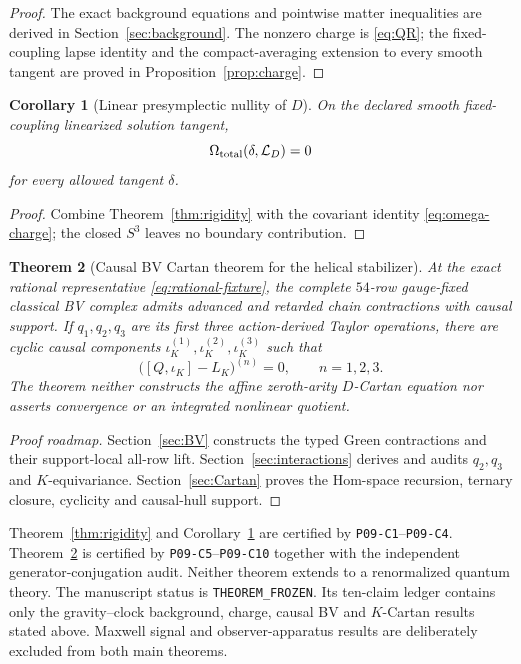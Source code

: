 \documentclass[11pt]{article}
\newtheorem{theorem}{Theorem}[section]
\newtheorem{corollary}[theorem]{Corollary}
\theoremstyle{definition}
\theoremstyle{remark}
\newcommand{\cL}{\mathcal L}
\newcommand{\claimid}[1]{\texttt{#1}}
\begin{document}
\begin{proof}
The exact background equations and pointwise matter inequalities are derived
in Section~\ref{sec:background}.  The nonzero charge is \eqref{eq:QR}; the
fixed-coupling lapse identity and the compact-averaging extension to every
smooth tangent are proved in Proposition~\ref{prop:charge}.
\end{proof}

\begin{corollary}[Linear presymplectic nullity of $D$]\label{cor:D-nullity}
On the declared smooth fixed-coupling linearized solution tangent,
\begin{equation}\label{eq:main-degeneracy}
 \Omega_{\rm total}(\delta,\cL_D)=0
\end{equation}
for every allowed tangent $\delta$.
\end{corollary}

\begin{proof}
Combine Theorem~\ref{thm:rigidity} with the covariant identity
\eqref{eq:omega-charge}; the closed $S^3$ leaves no boundary contribution.
\end{proof}

\begin{theorem}[Causal BV Cartan theorem for the helical stabilizer]
\label{thm:K-cartan}
At the exact rational representative \eqref{eq:rational-fixture}, the complete
$54$-row gauge-fixed classical BV complex admits advanced and retarded chain
contractions with causal support.  If $q_1,q_2,q_3$ are its first three
action-derived Taylor operations, there are cyclic causal components
$\iota_K^{(1)},\iota_K^{(2)},\iota_K^{(3)}$ such that
\begin{equation}\label{eq:invariant-cartan}
 \bigl([Q,\iota_K]-L_K\bigr)^{(n)}=0,
 \qquad n=1,2,3.
\end{equation}
The theorem neither constructs the affine zeroth-arity $D$-Cartan equation
nor asserts convergence or an integrated nonlinear quotient.
\end{theorem}

\begin{proof}[Proof roadmap]
Section~\ref{sec:BV} constructs the typed Green contractions and their
support-local all-row lift.  Section~\ref{sec:interactions} derives and audits
$q_2,q_3$ and $K$-equivariance.  Section~\ref{sec:Cartan} proves the Hom-space
recursion, ternary closure, cyclicity and causal-hull support.
\end{proof}

Theorem~\ref{thm:rigidity} and Corollary~\ref{cor:D-nullity} are certified by
\claimid{P09-C1}--\claimid{P09-C4}.  Theorem~\ref{thm:K-cartan} is certified
by \claimid{P09-C5}--\claimid{P09-C10} together with the independent
generator-conjugation audit.  Neither theorem extends to a renormalized
quantum theory.
The manuscript status is \texttt{THEOREM\_FROZEN}.  Its ten-claim ledger
contains only the gravity--clock background, charge, causal BV and
$K$-Cartan results stated above.  Maxwell signal and observer-apparatus
results are deliberately excluded from both main theorems.
\end{document}
